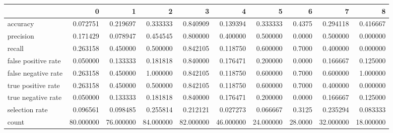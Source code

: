 \begin{tabular}{lrrrrrrrrr}
\toprule
{} &          0 &          1 &          2 &          3 &          4 &          5 &        6 &          7 &          8 \\
\midrule
accuracy            &   0.072751 &   0.219697 &   0.333333 &   0.840909 &   0.139394 &   0.333333 &   0.4375 &   0.294118 &   0.416667 \\
precision           &   0.171429 &   0.078947 &   0.454545 &   0.800000 &   0.400000 &   0.500000 &   0.0000 &   0.500000 &   0.000000 \\
recall              &   0.263158 &   0.450000 &   0.500000 &   0.842105 &   0.118750 &   0.600000 &   0.7000 &   0.400000 &   0.000000 \\
false positive rate &   0.050000 &   0.133333 &   0.181818 &   0.840000 &   0.176471 &   0.200000 &   0.0000 &   0.166667 &   0.125000 \\
false negative rate &   0.263158 &   0.450000 &   1.000000 &   0.842105 &   0.118750 &   0.600000 &   0.7000 &   0.600000 &   1.000000 \\
true positive rate  &   0.263158 &   0.450000 &   0.500000 &   0.842105 &   0.118750 &   0.600000 &   0.7000 &   0.400000 &   0.000000 \\
true negative rate  &   0.050000 &   0.133333 &   0.181818 &   0.840000 &   0.176471 &   0.200000 &   0.0000 &   0.166667 &   0.125000 \\
selection rate      &   0.096561 &   0.098485 &   0.255814 &   0.212121 &   0.027273 &   0.066667 &   0.3125 &   0.235294 &   0.083333 \\
count               &  80.000000 &  76.000000 &  84.000000 &  82.000000 &  46.000000 &  24.000000 &  28.0000 &  32.000000 &  18.000000 \\
\bottomrule
\end{tabular}
